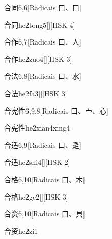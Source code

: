 \begin{entry}{合同}{6,6}[Radicais ⼝、⼝]
  \begin{phonetics}{合同}{he2tong5}[][HSK 4]
  \end{phonetics}
\end{entry}

\begin{entry}{合作}{6,7}[Radicais ⼝、⼈]
  \begin{phonetics}{合作}{he2zuo4}[][HSK 3]
  \end{phonetics}
\end{entry}

\begin{entry}{合法}{6,8}[Radicais ⼝、⽔]
  \begin{phonetics}{合法}{he2fa3}[][HSK 3]
  \end{phonetics}
\end{entry}

\begin{entry}{合宪性}{6,9,8}[Radicais ⼝、⼧、⼼]
  \begin{phonetics}{合宪性}{he2xian4xing4}
  \end{phonetics}
\end{entry}

\begin{entry}{合适}{6,9}[Radicais ⼝、⾡]
  \begin{phonetics}{合适}{he2shi4}[][HSK 2]
  \end{phonetics}
\end{entry}

\begin{entry}{合格}{6,10}[Radicais ⼝、⽊]
  \begin{phonetics}{合格}{he2ge2}[][HSK 3]
  \end{phonetics}
\end{entry}

\begin{entry}{合资}{6,10}[Radicais ⼝、⾙]
  \begin{phonetics}{合资}{he2zi1}
  \end{phonetics}
\end{entry}


